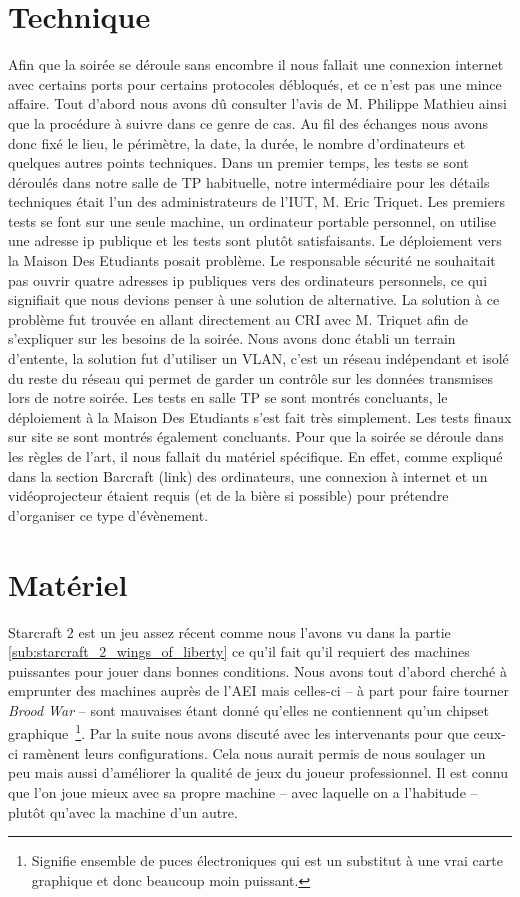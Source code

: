 \section{Technique}%
\label{sec:technique}

Afin que la soirée se déroule sans encombre il nous fallait une connexion
internet avec certains ports pour certains protocoles débloqués, et ce
n'est pas une mince affaire. Tout d'abord nous avons dû consulter l'avis de
M. Philippe Mathieu ainsi que la procédure à suivre dans ce genre de cas. Au fil
des échanges nous avons donc fixé le lieu, le périmètre, la date, la
durée, le nombre d'ordinateurs et quelques autres points techniques.
Dans un premier temps, les tests se sont déroulés dans notre salle de TP
habituelle, notre intermédiaire pour les détails techniques était l'un des
administrateurs de l'IUT, M. Eric Triquet.
Les premiers tests se font sur une seule machine, un ordinateur portable personnel,
on utilise une adresse ip publique et les tests sont plutôt satisfaisants.
Le déploiement vers la Maison Des Etudiants posait problème. Le responsable sécurité ne souhaitait pas ouvrir
quatre adresses ip publiques vers des ordinateurs personnels, ce qui signifiait
que nous devions penser à une solution de alternative. La solution à ce problème fut
trouvée en allant directement au CRI avec M. Triquet afin de
s'expliquer sur les besoins de la soirée. Nous avons donc établi un
terrain d'entente, la solution fut d'utiliser un VLAN, c'est un réseau
indépendant et isolé du reste du réseau qui permet de garder un contrôle
sur les données transmises lors de notre soirée. Les tests en salle TP
se sont montrés concluants, le déploiement à la Maison Des
Etudiants s'est fait très simplement. Les tests finaux sur site se sont montrés
également concluants.
Pour que la soirée se déroule dans les règles de l'art, il nous fallait
du matériel spécifique. En effet, comme expliqué dans la section
Barcraft (link) des ordinateurs, une connexion à internet et un
vidéoprojecteur étaient requis (et de la bière si possible) pour prétendre d'organiser ce type d'évènement.

\section{Matériel}%
\label{sec:materiel}

Starcraft 2 est un jeu assez récent comme nous l'avons vu dans la
partie \ref{sub:starcraft_2_wings_of_liberty} ce qu'il fait qu'il requiert des machines puissantes pour jouer
dans bonnes conditions. Nous avons tout d'abord cherché à emprunter des
machines auprès de l'AEI mais celles-ci -- à part pour faire tourner
\emph{Brood
War} -- sont mauvaises étant donné qu'elles ne contiennent qu'un chipset
graphique\, \footnote{Signifie \og ensemble de puces électroniques \fg{}
qui est un substitut à une vrai carte graphique et donc beaucoup moin
puissant.}. Par la suite nous avons discuté avec les
intervenants pour que ceux-ci ramènent leurs configurations. Cela nous
aurait permis de nous soulager un peu mais aussi d'améliorer la qualité
de jeux du joueur professionnel. Il est connu que l'on joue mieux avec sa
propre machine -- avec laquelle on a l'habitude -- plutôt qu'avec la machine d'un
autre.

